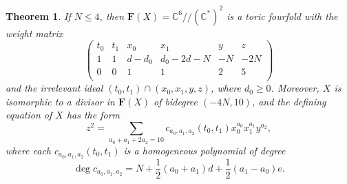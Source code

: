 \documentclass[a4paper,11pt]{amsart}
\newtheorem{thm}{Theorem}[section]
\theoremstyle{definition}
\theoremstyle{remark}
\numberwithin{equation}{section}
\begin{document}
\begin{thm}\label{thm: X is hypersurface}
	If $N \leq 4$, then $\mathbf{F}(X) = \mathbb{C}^6 /\!/ (\mathbb{C}^*)^2$ is a toric fourfold with the weight matrix
	\begin{equation}\label{eq: matrix with good weights}
		\begin{pmatrix}
			t_0 & t_1 & x_0 & x_1 & y & z \\
			1 & 1 & d-d_0 & d_0-2d-N & -N & -2N \\
			0 & 0 & 1 & 1 & 2 & 5 \\
		\end{pmatrix}
	\end{equation}
	and the irrelevant ideal $(t_0,t_1) \cap (x_0,x_1,y,z)$, where $d_0 \ge 0$. %
    Moreover, $X$ is isomorphic to a divisor in $\mathbf{F}(X)$ of bidegree $(-4N, 10)$, and the defining equation of $X$ has the form 
	\begin{equation} \label{eq: defining equation}
		z^2 = \sum_{a_0 + a_1 + 2a_2 = 10} c_{a_0, a_1, a_2}(t_0, t_1) x_0^{a_0} x_1^{a_1} y^{a_2},
	\end{equation}
	where each $c_{a_0, a_1, a_2}(t_0, t_1)$ is a homogeneous polynomial of degree
	\begin{equation} \label{eq: degree c}
		\deg c_{a_0, a_1, a_2} = N + \frac12 (a_0 + a_1) d + \frac 12 (a_1-a_0) e.
	\end{equation}
\end{thm}
\end{document}
